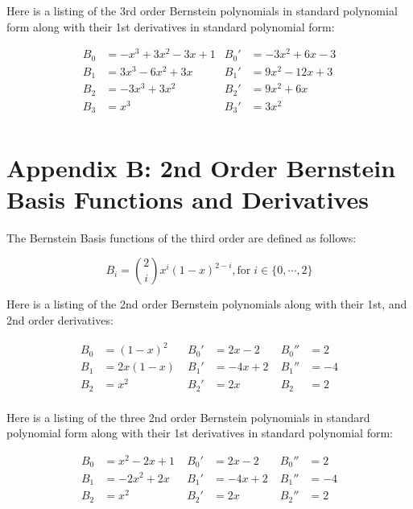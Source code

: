 \documentclass[12pt, letterpaper]{article}
\begin{document}
Here is a listing of the 3rd order Bernstein polynomials in standard polynomial form along with their 1st derivatives in standard polynomial form:

\begin{align*}
B_{0} &= -x^{3} + 3x^{2} - 3x + 1 &B_{0}' &= -3x^{2} + 6x - 3\\
B_{1} &= 3x^{3} - 6x^{2} + 3x      &B_{1}' &= 9x^{2} - 12x + 3\\
B_{2} &= -3x^{3} + 3x^{2} &B_{2}' &= 9x^{2} + 6x\\
B_{3} &= x^{3} &B_{3}' &= 3x^{2}\\
\end{align*}


\newpage

\section*{Appendix B: 2nd Order Bernstein Basis Functions and Derivatives}

The Bernstein Basis functions of the third order are defined as follows:

$$B_{i} = \binom {2}{i} x^{i}(1 - x)^{2 - i}, \text{for} \; i \in \{0, \cdots, 2\}$$

Here is a listing of the 2nd order Bernstein polynomials along with their 1st, and 2nd order derivatives:

\begin{align*}
B_{0} &= (1 - x)^{2} \;& B_{0}' &= 2x - 2 \; & B_{0}'' &= 2\\
B_{1} &= 2x(1-x) \;& B_{1}' &= -4x + 2 \; & B_{1}'' &= -4\\
B_{2} &= x^{2} \;& B_{2}' &= 2x \; & B_{2} &= 2\\
\end{align*}


Here is a listing of the three 2nd order Bernstein polynomials in standard polynomial form along with their 1st derivatives in standard polynomial form:

\begin{align*}
B_{0} &= x^{2} - 2x + 1 \; & B_{0}' &= 2x - 2 \; & B_{0}'' &= 2\\
B_{1} &= -2x^{2} + 2x \; & B_{1}' &= -4x + 2 \; &B_{1}'' &= -4\\
B_{2} &= x^{2} \; & B_{2}' &= 2x \; &B_{2}'' &= 2\\
\end{align*}


\newpage

\end{document}
